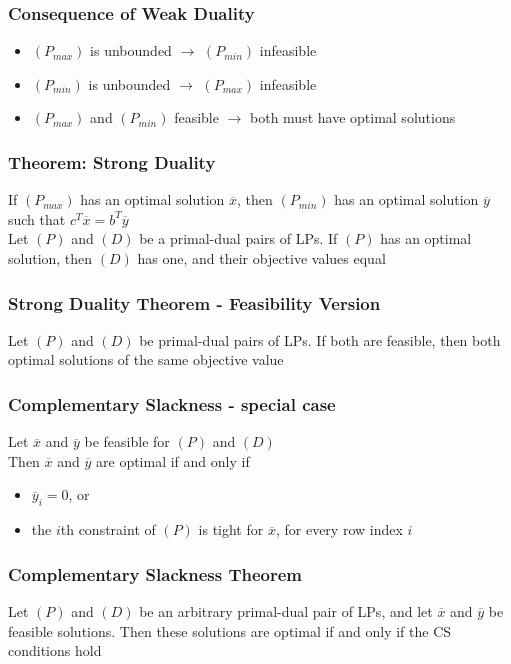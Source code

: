 \documentclass[11pt]{article}
\begin{document}
\subsubsection{Consequence of Weak Duality}
\begin{itemize}
  \item $(P_{max})$ is unbounded $\rightarrow$ $(P_{min})$ infeasible 
  \item $(P_{min})$ is unbounded $\rightarrow$ $(P_{max})$ infeasible 
  \item $(P_{max})$ and $(P_{min})$ feasible $\rightarrow$ both must have optimal solutions 
\end{itemize}
\subsubsection{Theorem: Strong Duality}
If $(P_{max})$ has an optimal solution $\overline{x}$, then $(P_{min})$ has an optimal solution $\overline{y}$
such that $c^T\overline{x} = b^T\overline{y}$ \\
Let $(P)$ and $(D)$ be a primal-dual pairs of LPs. If $(P)$ has an optimal solution, then $(D)$ has one, and their objective values equal 
\subsubsection{Strong Duality Theorem - Feasibility Version}
Let $(P)$ and $(D)$ be primal-dual pairs of LPs. If both are feasible, then both optimal solutions of the same objective value 
\subsubsection{Complementary Slackness - special case}
Let $\overline{x}$ and $\overline{y}$ be feasible for $(P)$ and $(D)$ \\
Then $\overline{x}$ and $\overline{y}$ are optimal if and only if 
\begin{itemize}
  \item $\overline{y}_i = 0$, or 
  \item the $i$th constraint of $(P)$ is tight for $\overline{x}$, for every row index $i$
\end{itemize}
\subsubsection{Complementary Slackness Theorem}
Let $(P)$ and $(D)$ be an arbitrary primal-dual pair of LPs, and let $\overline{x}$ and $\overline{y}$ be feasible solutions. Then
these solutions are optimal if and only if the CS conditions hold 
\end{document}
